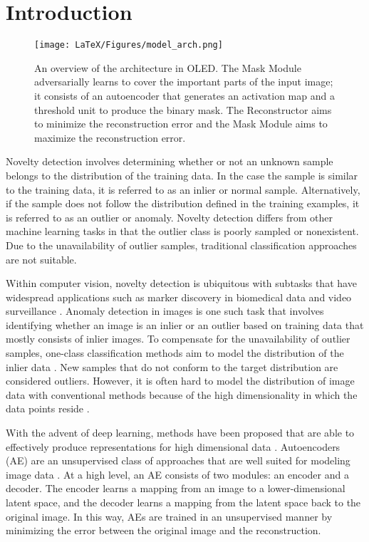 \documentclass[10pt,twocolumn,letterpaper]{article}
\begin{document}
\section{Introduction}

\begin{figure*}[t]
\begin{center}
\texttt{[image: LaTeX/Figures/model\_arch.png]}\end{center}
   \caption{An overview of the architecture in OLED. The Mask Module adversarially learns to cover the important parts of the input image; it consists of an autoencoder that generates an activation map and a threshold unit to produce the binary mask. The Reconstructor aims to minimize the reconstruction error and the Mask Module aims to maximize the reconstruction error.}
\label{model_overview}
\end{figure*}


Novelty detection involves determining whether or not an unknown sample belongs to the distribution of the training data. In the case the sample is similar to the training data, it is referred to as an inlier or normal sample. Alternatively, if the sample does not follow the distribution defined in the training examples, it is referred to as an outlier or anomaly. Novelty detection differs from other machine learning tasks in that the outlier class is poorly sampled or nonexistent. Due to the unavailability of outlier samples, traditional classification approaches are not suitable. 

Within computer vision, novelty detection is ubiquitous with subtasks that have widespread applications such as marker discovery in biomedical data \cite{schlegl2017unsupervised} and video surveillance \cite{luo2017revisit}. Anomaly detection in images is one such task that involves identifying whether an image is an inlier or an outlier based on training data that mostly consists of inlier images. To compensate for the unavailability of outlier samples, one-class classification methods aim to model the distribution of the inlier data \cite{zimek2012survey}. New samples that do not conform to the target distribution are considered outliers. However, it is often hard to model the distribution of image data with conventional methods because of the high dimensionality in which the data points reside \cite{zimek2012survey}.

With the advent of deep learning, methods have been proposed that are able to effectively produce representations for high dimensional data \cite{bengio2013representation}. Autoencoders (AE) are an unsupervised class of approaches that are well suited for modeling image data \cite{bengio2007greedy}. At a high level, an AE consists of two modules: an encoder and a decoder. The encoder learns a mapping from an image to a lower-dimensional latent space, and the decoder learns a mapping from the latent space back to the original image. In this way, AEs are trained in an unsupervised manner by minimizing the error between the original image and the reconstruction.
\end{document}
